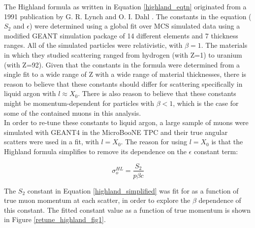 \documentclass[a4paper,11pt]{article}
\begin{document}
The Highland formula as written in Equation \ref{highland_eqtn} originated from a 1991 publication by G. R. Lynch and O. I. Dahl \cite{highland-lynch-dahl}. The constants in the equation ($S_2$ and $\epsilon$) were determined using a global fit over MCS simulated data using a modified GEANT simulation package of 14 different elements and 7 thickness ranges. All of the simulated particles were relativistic, with $\beta=1$. The materials in which they studied scattering ranged from hydrogen (with Z=1) to uranium (with Z=92). Given that the constants in the formula were determined from a single fit to a wide range of Z with a wide range of material thicknesses, there is reason to believe that these constants should differ for scattering specifically in liquid argon with $l \approx X_0$. There is also reason to believe that these constants might be momentum-dependent for particles with $\beta < 1$, which is the case for some of the contained muons in this analysis.\\

In order to re-tune these constants to liquid argon, a large sample of muons were simulated with GEANT4 \cite{GEANT4_citation} in the MicroBooNE TPC and their true angular scatters were used in a fit, with $l = X_0$. The reason for using $l = X_0$ is that the Highland formula simplifies to remove its dependence on the $\epsilon$ constant term:

\begin{equation}\label{highland_simplified}
	\sigma_o^{HL}=\frac{S_2}{p\beta c}
\end{equation}

The $S_2$ constant in Equation \ref{highland_simplified} was fit for as a function of true muon momentum at each scatter, in order to explore the $\beta$ dependence of this constant. The fitted constant value as a function of true momentum is shown in Figure \ref{retune_highland_fig1}.


\end{document}

